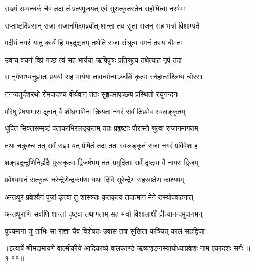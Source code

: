 \twolineshloka
{सख्यं सम्बन्धकं चैव तदा तं प्रत्यपूजयत्}
{एवं सुसत्कृतस्तेन सहोषित्वा नरर्षभः} %

\twolineshloka
{सप्ताष्टदिवसान् राजा राजानमिदमब्रवीत्}
{शान्ता तव सुता राजन् सह भर्त्रा विशाम्पते} %

\twolineshloka
{मदीयं नगरं यातु कार्यं हि महदुद्यतम्}
{तथेति राजा संश्रुत्य गमनं तस्य धीमतः} %

\twolineshloka
{उवाच वचनं विप्रं गच्छ त्वं सह भार्यया}
{ऋषिपुत्रः प्रतिश्रुत्य तथेत्याह नृपं तदा} %

\twolineshloka
{स नृपेणाभ्यनुज्ञातः प्रययौ सह भार्यया}
{तावन्योन्याञ्जलिं कृत्वा स्नेहात्संश्लिष्य चोरसा} %

\twolineshloka
{ननन्दतुर्दशरथो रोमपादश्च वीर्यवान्}
{ततः सुहृदमापृच्छ्य प्रस्थितो रघुनन्दनः} %

\twolineshloka
{पौरेषु प्रेषयामास दूतान् वै शीघ्रगामिनः}
{क्रियतां नगरं सर्वं क्षिप्रमेव स्वलङ्कृतम्} %

\twolineshloka
{धूपितं सिक्तसम्मृष्टं पताकाभिरलङ्कृतम्}
{ततः प्रहृष्टाः पौरास्ते श्रुत्वा राजानमागतम्} %

\twolineshloka
{तथा चक्रुश्च तत् सर्वं राज्ञा यत् प्रेषितं तदा}
{ततः स्वलङ्कृतं राजा नगरं प्रविवेश ह} %

\twolineshloka
{शङ्खदुन्दुभिनिर्ह्रादैः पुरस्कृत्वा द्विजर्षभम्}
{ततः प्रमुदिताः सर्वे दृष्ट्वा वै नागरा द्विजम्} %

\twolineshloka
{प्रवेश्यमानं सत्कृत्य नरेन्द्रेणेन्द्रकर्मणा}
{यथा दिवि सुरेन्द्रेण सहस्राक्षेण काश्यपम्} %

\twolineshloka
{अन्तःपुरं प्रवेश्यैनं पूजां कृत्वा तु शास्त्रतः}
{कृतकृत्यं तदात्मानं मेने तस्योपवाहनात्} %

\twolineshloka
{अन्तःपुराणि सर्वाणि शान्तां दृष्ट्वा तथागताम्}
{सह भर्त्रा विशालाक्षीं प्रीत्यानन्दमुपागमन्} %

\twolineshloka
{पूज्यमाना तु ताभिः सा राज्ञा चैव विशेषतः}
{उवास तत्र सुखिता कञ्चित् कालं सहद्विजा} %


॥इत्यार्षे श्रीमद्रामायणे वाल्मीकीये आदिकाव्ये बालकाण्डे ऋष्यशृङ्गस्यायोध्याप्रवेशः नाम एकादशः सर्गः ॥१-११॥
